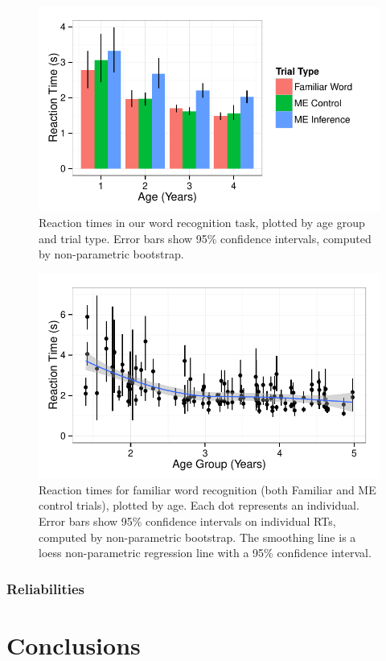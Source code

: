 \documentclass[man,noapacite]{apa2}
\begin{document}
\begin{figure}[t] 
  \begin{center} 
    \includegraphics[width=5in]{figures/rt.pdf} 
    \caption{\label{fig:rt} Reaction times in our word recognition task, plotted by age group and trial type. Error bars show 95\% confidence intervals, computed by non-parametric bootstrap.}
  \end{center} 
\end{figure}


\begin{figure}[t] 
  \begin{center} 
    \includegraphics[width=5in]{figures/individuals.pdf} 
    \caption{\label{fig:rt} Reaction times for familiar word recognition (both Familiar and ME control trials), plotted by age. Each dot represents an individual. Error bars show 95\% confidence intervals on individual RTs, computed by non-parametric bootstrap. The smoothing line is a loess non-parametric regression line with a 95\% confidence interval.}
  \end{center} 
\end{figure}


\subsubsection{Reliabilities}

\section{Conclusions} 




\end{document}
